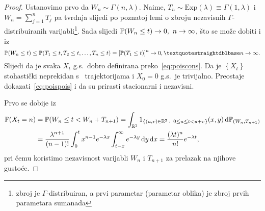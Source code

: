 \documentclass[main.tex]{subfiles}
\begin{document}
\begin{proof}
	Ustanovimo prvo da \( W_n \sim \Gamma(n, \lambda) \). Naime, \( T_n \sim \mathrm{Exp}(\lambda) \equiv \Gamma(1, \lambda) \) i
	\( W_n = \sum_{j=1}^n T_j \) pa tvrdnja slijedi po poznatoj lemi o zbroju nezavisnih \( \Gamma \)-distribuiranih varijabli\footnote{zbroj
		je \( \Gamma \)-distribuiran, a prvi parametar (parametar oblika) je zbroj prvih parametara sumanada}. Sada slijedi \( \mathbb{P}(W_n \le t) \rightarrow 0,\ n \rightarrow \infty \), što se
	može dobiti i iz
	\[
		\P(W_n \le t) \le \P(T_1 \le t, T_2 \le t, \ldots, T_n \le t) = \left[ \P(T_1 \le t) \right]^n \rightarrow 0, \textquotestraightdblbase n \ub.
	\]
	Slijedi da je svaka \( X_t \) g.s.\ dobro definirana preko~\eqref{eq:poiscons}. Da je \( \left\{ X_t \right\} \) stohastički neprekidan
	s \cadlag \ trajektorijama i \( X_0 = 0 \) g.s.\ je trivijalno. Preostaje dokazati~\eqref{eq:poispois} i da su prirasti stacionarni i nezavisni.

	Prvo se dobije iz
	\begin{align}
		\mathbb{P}(X_t = n) & = \mathbb{P}(W_n \le t < W_n + T_{n+1}) =
		\int_{\mathbb{R}^2} 1_{\left\{ (u, v) \in \mathbb{R}^2 \, \colon \, 0 \le u \le t < u+v \right\}}(x,y) \,\mathrm d \mathbb{P}_{(W_n, T_{n+1})} \\ &= \frac{\lambda^{n+1}}{(n-1)!} \int_0^t x^{n-1}e^{-\lambda x} \int_{t-x}^\infty e^{-\lambda y} \,\mathrm d y \,\mathrm d x
		= \frac{(\lambda t)^n}{n!}e^{-\lambda t},
	\end{align}
	pri čemu koristimo nezavisnost varijabli \( W_n \) i \( T_{n+1} \) za prelazak na njihove gustoće.


\end{proof}
\end{document}

